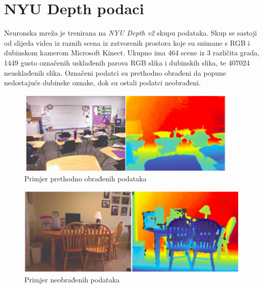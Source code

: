 \documentclass[times, utf8, zavrsni, numeric]{fer}
\begin{document}
\section{NYU Depth podaci}
Neuronska mreža je trenirana na \textit{NYU Depth v2} skupu podataka.
Skup se sastoji od slijeda videa iz raznih scena iz zatvorenih prostora 
koje su snimane s RGB i dubinskom kamerom Microsoft Kinect. Ukupno ima
464	scene iz 3 različita grada, 1449 gusto označenih usklađenih parova
RGB slika i dubinskih slika, te 407024 neusklađenih slika. Označeni podatci
su prethodno obrađeni da popune nedostajuće dubinske oznake, dok su ostali
podatci neobrađeni.
\begin{figure}[htb]
	\centering
	\includegraphics[scale=1]{labeled.png}
	\caption{Primjer prethodno obrađenih podataka}
	\label{fig:lab}
\end{figure}
\begin{figure}[htb]
	\centering
	\includegraphics[scale=0.7]{raw.png}
	\caption{Primjer neobrađenih podataka}
	\label{fig:lab}
\end{figure}
\newpage  
\end{document}
